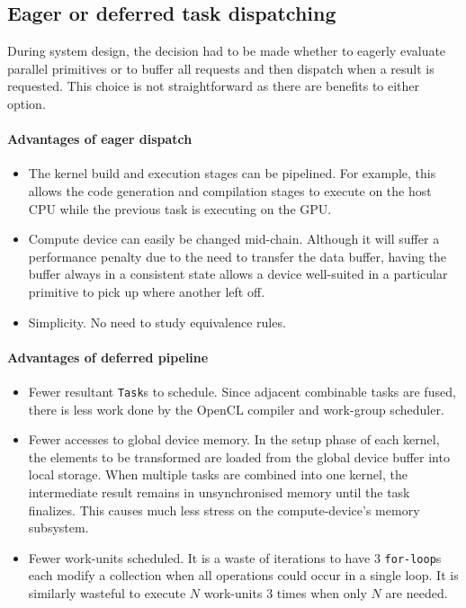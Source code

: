 \subsection{Eager or deferred task dispatching}
During system design, the decision had to be made whether to eagerly evaluate parallel primitives or to buffer all requests and then dispatch when a result is requested. This choice is not straightforward as there are benefits to either option.

\paragraph*{Advantages of eager dispatch}
\begin{itemize}
\item The kernel build and execution stages can be pipelined. For example, this allows the code generation and compilation stages to execute on the host \ac{CPU} while the previous task is executing on the \ac{GPU}.

\item Compute device can easily be changed mid-chain. Although it will suffer a performance penalty due to the need to transfer the data buffer, having the buffer always in a consistent state allows a device well-suited in a particular primitive to pick up where another left off.

\item Simplicity. No need to study equivalence rules.
\end{itemize}

\paragraph*{Advantages of deferred pipeline}
\begin{itemize}
\item Fewer resultant \verb|Task|s to schedule. Since adjacent combinable tasks are fused, there is less work done by the \ac{OpenCL} compiler and work-group scheduler.

\item Fewer accesses to global device memory. In the setup phase of each kernel, the elements to be transformed are loaded from the global device buffer into local storage. When multiple tasks are combined into one kernel, the intermediate result remains in unsynchronised memory until the task finalizes. This causes much less stress on the compute-device's memory subsystem.

\item Fewer work-units scheduled. It is a waste of iterations to have $3$ \verb|for-loop|s each modify a collection when all operations could occur in a single loop. It is similarly wasteful to execute $N$ work-units $3$ times when only $N$ are needed.
\end{itemize}

